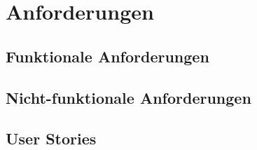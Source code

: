 \section{Anforderungen}
\subsection{Funktionale Anforderungen}
\subsection{Nicht-funktionale Anforderungen}
\subsection{User Stories}